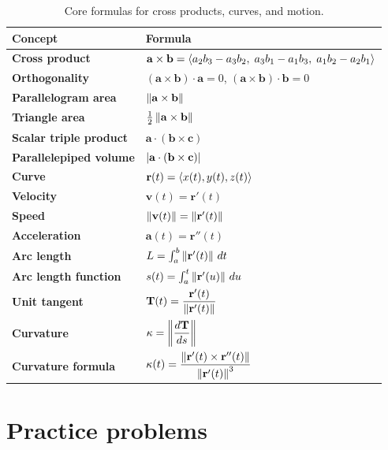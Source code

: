 \renewcommand{\arraystretch}{1.25}
\begin{table}[H]
\centering
\begin{tabularx}{\textwidth}{>{\bfseries}p{}X}
\toprule
Concept & Formula \\
\midrule
Cross product & $\mathbf a\times\mathbf b=\left\langle a_2b_3-a_3b_2,\;a_3b_1-a_1b_3,\;a_1b_2-a_2b_1\right\rangle$ \\
Orthogonality & $(\mathbf a\times\mathbf b)\cdot\mathbf a=0$, $(\mathbf a\times\mathbf b)\cdot\mathbf b=0$ \\
Parallelogram area & $\left\lVert \mathbf a\times\mathbf b\right\rVert$ \\
Triangle area & $\frac12\left\lVert \mathbf a\times\mathbf b\right\rVert$ \\
Scalar triple product & $\mathbf a\cdot(\mathbf b\times\mathbf c)$ \\
Parallelepiped volume & $\left\lvert \mathbf a\cdot(\mathbf b\times\mathbf c)\right\rvert$ \\
Curve & $\mathbf r(t)=\left\langle x(t),y(t),z(t)\right\rangle$ \\
Velocity & $\mathbf v(t)=\mathbf r'(t)$ \\
Speed & $\left\lVert \mathbf v(t)\right\rVert=\left\lVert \mathbf r'(t)\right\rVert$ \\
Acceleration & $\mathbf a(t)=\mathbf r''(t)$ \\
Arc length & $L=\int_a^b\left\lVert \mathbf r'(t)\right\rVert\,d t$ \\
Arc length function & $s(t)=\int_a^t\left\lVert \mathbf r'(u)\right\rVert\,d u$ \\
Unit tangent & $\mathbf T(t)=\dfrac{\mathbf r'(t)}{\left\lVert \mathbf r'(t)\right\rVert}$ \\
Curvature & $\kappa=\left\lVert \dfrac{d\mathbf T}{ds}\right\rVert$ \\
Curvature formula & $\kappa(t)=\dfrac{\left\lVert \mathbf r'(t)\times\mathbf r''(t)\right\rVert}{\left\lVert \mathbf r'(t)\right\rVert^3}$ \\
\bottomrule
\end{tabularx}
\caption{Core formulas for cross products, curves, and motion.}
\end{table}
\renewcommand{\arraystretch}{1}

\section{Practice problems}

